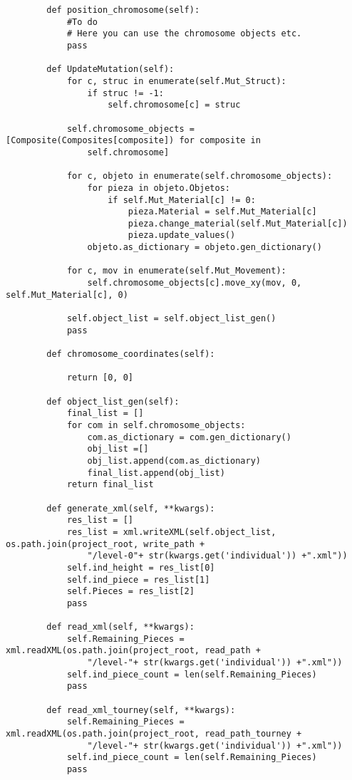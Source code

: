 \begin{verbatim}
        def position_chromosome(self):
            #To do
            # Here you can use the chromosome objects etc.
            pass
        
        def UpdateMutation(self):
            for c, struc in enumerate(self.Mut_Struct):
                if struc != -1:
                    self.chromosome[c] = struc

            self.chromosome_objects = [Composite(Composites[composite]) for composite in 
                self.chromosome]

            for c, objeto in enumerate(self.chromosome_objects):
                for pieza in objeto.Objetos:
                    if self.Mut_Material[c] != 0:
                        pieza.Material = self.Mut_Material[c]
                        pieza.change_material(self.Mut_Material[c])
                        pieza.update_values()
                objeto.as_dictionary = objeto.gen_dictionary()

            for c, mov in enumerate(self.Mut_Movement):
                self.chromosome_objects[c].move_xy(mov, 0, self.Mut_Material[c], 0)

            self.object_list = self.object_list_gen()
            pass
        
        def chromosome_coordinates(self):
            
            return [0, 0]
        
        def object_list_gen(self):
            final_list = []
            for com in self.chromosome_objects:
                com.as_dictionary = com.gen_dictionary()
                obj_list =[]
                obj_list.append(com.as_dictionary)
                final_list.append(obj_list)
            return final_list
        
        def generate_xml(self, **kwargs):
            res_list = []
            res_list = xml.writeXML(self.object_list, os.path.join(project_root, write_path + 
                "/level-0"+ str(kwargs.get('individual')) +".xml"))
            self.ind_height = res_list[0]
            self.ind_piece = res_list[1]
            self.Pieces = res_list[2]
            pass
        
        def read_xml(self, **kwargs):
            self.Remaining_Pieces = xml.readXML(os.path.join(project_root, read_path + 
                "/level-"+ str(kwargs.get('individual')) +".xml"))
            self.ind_piece_count = len(self.Remaining_Pieces)
            pass
        
        def read_xml_tourney(self, **kwargs):
            self.Remaining_Pieces = xml.readXML(os.path.join(project_root, read_path_tourney + 
                "/level-"+ str(kwargs.get('individual')) +".xml"))
            self.ind_piece_count = len(self.Remaining_Pieces)
            pass
        

\end{verbatim}
